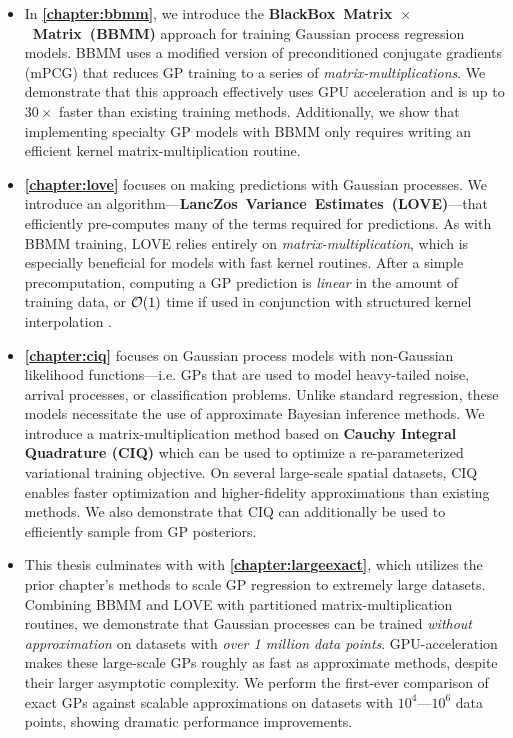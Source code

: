 \begin{itemize}
  \item In {\bf \cref{chapter:bbmm}}, we introduce the {\bf BlackBox~Matrix~$\times$~Matrix~(BBMM)} approach for training Gaussian process regression models.
    BBMM uses a modified version of preconditioned conjugate gradients (mPCG) that reduces GP training to a series of \emph{matrix-multiplications}.
    We demonstrate that this approach effectively uses GPU acceleration and is up to $30\times$ faster than existing training methods.
    Additionally, we show that implementing specialty GP models with BBMM only requires writing an efficient kernel matrix-multiplication routine.

  \item {\bf \cref{chapter:love}} focuses on making predictions with Gaussian processes.
    We introduce an algorithm---{\bf LancZos~Variance~Estimates~(LOVE)}---that efficiently pre-computes many of the terms required for predictions.
    As with BBMM training, LOVE relies entirely on \emph{matrix-multiplication}, which is especially beneficial for models with fast kernel routines.
    After a simple precomputation, computing a GP prediction is \emph{linear} in the amount of training data, or $\bigo{1}$ time if used in conjunction with structured kernel interpolation \cite{wilson2015kernel}.

  \item {\bf \cref{chapter:ciq}} focuses on Gaussian process models with non-Gaussian likelihood functions---i.e. GPs that are used to model heavy-tailed noise, arrival processes, or classification problems.
    Unlike standard regression, these models necessitate the use of approximate Bayesian inference methods.
    We introduce a matrix-multiplication method based on {\bf Cauchy Integral Quadrature (CIQ)} which can be used to optimize a re-parameterized variational training objective.
    On several large-scale spatial datasets, CIQ enables faster optimization and higher-fidelity approximations than existing methods.
    We also demonstrate that CIQ can additionally be used to efficiently sample from GP posteriors.

  \item This thesis culminates with with {\bf \cref{chapter:largeexact}}, which utilizes the prior chapter's methods to scale GP regression to extremely large datasets.
    Combining BBMM and LOVE with partitioned matrix-multiplication routines, we demonstrate that Gaussian processes can be trained \emph{without approximation} on datasets with \emph{over 1 million data points}.
    GPU-acceleration makes these large-scale GPs roughly as fast as approximate methods, despite their larger asymptotic complexity.
    We perform the first-ever comparison of exact GPs against scalable approximations on datasets with $10^4$---$10^6$ data points, showing dramatic performance improvements.

\end{itemize}

